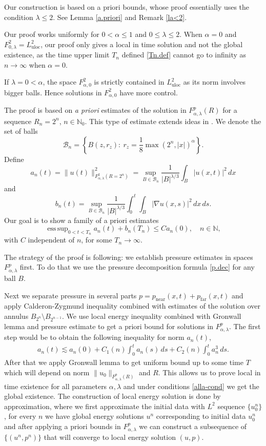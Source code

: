 \documentclass[11pt]{article}
\numberwithin{equation}{section}
\theoremstyle{remark}
\theoremstyle{definition}
\newcommand{\bket}[1]{\left \{ #1 \right \}}
\newcommand{\cB}{\mathcal{B}}
\newcommand{\nb}{\nabla}
\newcommand\al{\alpha}
\newcommand\la{\lambda}
\newcommand{\NN}{\mathbb{N}}
\newcommand{\esssup} {\mathop{\mathrm{ess\,sup}}}
\newcommand{\oo}{\infty}
\newcommand{\EQ}[1]{\begin{equation} #1 \end{equation}}
\newcommand{\EQN}[1]{\begin{equation*}\begin{split} #1 \end{split}\end{equation*}}
\newcommand{\uloc}{{\mathrm{uloc}}}
\begin{document}
{\item Our construction is based on a priori bounds, whose proof essentially uses the condition $\la \le 2$. See Lemma \ref{a.priori} and Remark \ref{la<2}.

\item Our proof works uniformly for $0<\al\le 1$ and $0 \le \la \le 2$. When $\al=0$ and $F^2_{0,\la}= L^2_\uloc$, our proof only gives a local in time solution and not the global existence, as the time upper limit $T_n$ defined \eqref{Tn.def} cannot go to infinity as $n \to \infty$ when $\al=0$.

\item If $\la=0<\al$, the space $F_{\al,0}^2$ is strictly contained in $L^2_\uloc$ as its norm involves bigger balls. Hence solutions in $F_{\al,0}^2$ have more control.

}



The proof is based on
\emph{a priori} estimates of the solution in $F^p_{\al,\la}(R)$ for a sequence $R_n=2^n$, $n \in \NN_0$. This type of estimate extends ideas in \cite{JiaSverak-minimal}.
We denote the set of balls
\EQ{\label{cCn.def}
\cB_n = \bket{ B(z,r_z): \ r_z=\frac18\max(2^n,|x|)^\al}.
}
Define
\EQ{\label{aln.def}
a_{n}(t) =   \| u(t)\|_{ F^2 _{\al,\la}(R=2^n)}^2
= \sup_{B\in \cB_n} \frac 1 {|B|^{\la/3}}\int_B |u(x,t)|^2\,dx
}
and
\EQ{\label{ben.def}
b_{n}(t)=\sup_{B\in \cB_n} \frac 1 {|B|^{\la/3}}\int_0^t\int_{B}|\nb u(x,s)|^2\,dx\,ds.
}
Our goal is to show a family of  a priori estimates
\EQ{
\esssup_{0<t<T_n} a_{n}(t) + b_{n}(T_n)  \le C a_{n}(0), \quad n \in \NN,
}
with $C$ independent of $n$, for some $T_n \to \oo$.


The strategy of the proof is following: we establish pressure estimates in spaces $F^p_{\al,\la}$ first. To do that we use the pressure decomposition formula \eqref{p.dec} for any ball $B$.

%
%
Next we separate pressure in several parts $p= p_\text{near}(x,t)+ p_\text{far}(x,t)$ and apply Calderon-Zygmund inequality combined with estimates of the solution over annulus $B_{2^n}\setminus B_{2^{n-1}}$. We use local energy inequality combined with Gronwall lemma and pressure estimate to get a priori bound for solutions in $F^p_{\al,\la}$. The first step would be to obtain the following inequality for norm $a_n(t)$,
 \EQN{
a_n (t) \lesssim a_n(0) +C_1(n)	 \int_0^t a_n(s)\,ds +C_2(n)	\int_0^t a_n^3 \,ds.
}
%
After that we apply Gronwall lemma to get uniform bound up to some time $T$ which will depend on norm $\|u_0\|_{F^p_{\al,\la}(R)}$ and $R$. This allows us to prove local in time existence for all parameters $\al,\la$ and under conditions \eqref{alla-cond} we get the global existence. The construction of local energy solution is done by approximation, where we first approximate the initial data with $L^2$ sequence $\{u^n_0\}$, for every $n$ we have global energy solutions $u^n$ corresponding to initial data $u_0^n$ and after applying a priori bounds in $F^p_{\al,\la}$ we can construct a subsequence of $\{(u^n,p^n)\}$ that will converge to local energy solution $(u,p)$.
\end{document}
